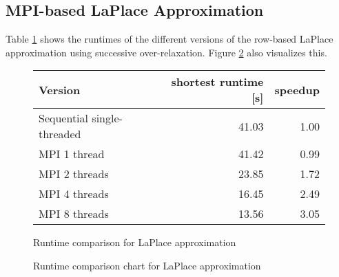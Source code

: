 \documentclass[]{article}
\begin{document}
\subsection{MPI-based LaPlace Approximation}

 Table \ref{tab:laplace-sor-runtime} shows the runtimes of the different versions of the row-based LaPlace approximation using successive over-relaxation. Figure \ref{fig:laplace-sor-chart} also visualizes this.

\begin{figure}[h]
	\centering
	\begin{tabular}{|l|r|r|}
		\hline
		\textbf{Version} & \textbf{shortest runtime [s]} & \textbf{speedup} \\
		\hline
		Sequential single-threaded	& 41.03 & 1.00 \\ 
		\hline 
		MPI 1 thread				& 41.42 & 0.99 \\ 
		\hline 
		MPI 2 threads				& 23.85 & 1.72 \\ 
		\hline 
		MPI 4 threads 				& 16.45 & 2.49 \\ 
		\hline 
		MPI 8 threads				& 13.56 & 3.05 \\ 
		\hline 
	\end{tabular} 
	\caption{Runtime comparison for LaPlace approximation}
	\label{tab:laplace-sor-runtime}
\end{figure}

\begin{figure}[h]
	\centering
	\caption{Runtime comparison chart for LaPlace approximation}
	\label{fig:laplace-sor-chart}
\end{figure}

\FloatBarrier
\clearpage
\newpage
\end{document}
